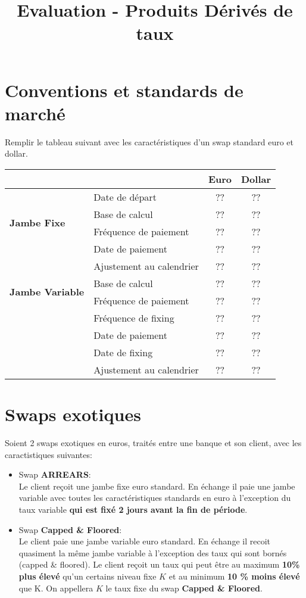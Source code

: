 \documentclass{article}
\begin{document}
\title{Evaluation - Produits Dérivés de taux}
\date{}
\maketitle
\section*{Conventions et standards de marché}
Remplir le tableau suivant avec les caractéristiques d'un swap standard euro et dollar.
\begin{center}
\begin{tabular}{|l|l|c|c|}
\hline
&&\textbf{Euro}&\textbf{Dollar}\\
\hline
&Date de départ&??&??\\
\hline
\multirow{2}{*}{\textbf{Jambe Fixe}}&Base de calcul&??&??\\
&Fréquence de paiement&??&??\\
&Date de paiement&??&??\\
&Ajustement au calendrier&??&??\\
\hline
\multirow{2}{*}{\textbf{Jambe Variable}}&Base de calcul&??&??\\
&Fréquence de paiement&??&??\\
&Fréquence de fixing&??&??\\
&Date de paiement&??&??\\
&Date de fixing&??&??\\ 
&Ajustement au calendrier&??&??\\
\hline
\end{tabular}
\end{center}

\section*{Swaps exotiques}
Soient 2 swaps exotiques en euros, traités entre une banque et son client, avec les caractistiques suivantes:
\begin{itemize}
\item Swap \textbf{ARREARS}:\\
Le client reçoit une jambe fixe euro standard. En échange il paie une jambe variable avec toutes les caractéristiques standards en euro à l'exception du taux variable \textbf{qui est fixé 2 jours avant la fin de période}.
\item Swap \textbf{Capped \& Floored}:\\
Le client paie une jambe variable euro standard. En échange il recoit quasiment la même jambe variable à l'exception des taux qui sont bornés (capped \& floored). Le client reçoit un taux qui peut être au maximum \textbf{10\% plus élevé} qu'un certains niveau fixe $K$ et au minimum \textbf{10 \% moins élevé} que K. On appellera $K$ le taux fixe du swap \textbf{Capped \& Floored}. 
\end{itemize}
\end{document}
